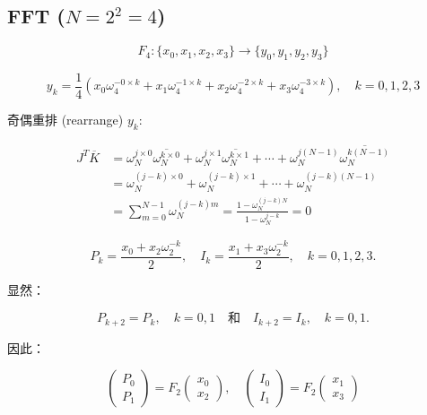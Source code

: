 \documentclass[12pt,a4paper]{article}
\numberwithin{subsection}{section}   %
\numberwithin{subsubsection}{subsection}
\theoremstyle{plain}
\theoremstyle{definition}
\theoremstyle{remark}
\theoremstyle{remark}
\begin{document}
\subsection{ FFT ($N=2^2=4$)}

\begin{equation}
	F_4: \{x_0, x_1, x_2, x_3\} \rightarrow \{y_0, y_1, y_2, y_3\}
\end{equation}

\begin{equation}
	y_k = \frac{1}{4} \left( x_0 \omega_4^{-0 \times k} + x_1 \omega_4^{-1 \times k} + x_2 \omega_4^{-2 \times k} + x_3 \omega_4^{-3 \times k} \right), \quad k = 0, 1, 2, 3
\end{equation}

奇偶重排 (rearrange) $y_k$:

\begin{equation}
	\begin{aligned}
		J^T \overline{K} &= \omega_N^{j \times 0} \overline{\omega_N^{k \times 0}} + \omega_N^{j \times 1} \overline{\omega_N^{k \times 1}} + \cdots + \omega_N^{j(N-1)} \overline{\omega_N^{k(N-1)}} \\[8pt]
		&= \omega_N^{(j - k) \times 0} + \omega_N^{(j - k) \times 1} + \cdots + \omega_N^{(j - k)(N-1)} \\[8pt]
		&= \sum_{m=0}^{N-1} \omega_N^{(j - k)m} = \frac{1 - \omega_N^{(j - k)N}}{1 - \omega_N^{j - k}} = 0
	\end{aligned}
\end{equation}


\begin{equation}
	P_k = \frac{x_0 + x_2 \omega_2^{-k}}{2}, \quad I_k = \frac{x_1 + x_3 \omega_2^{-k}}{2}, \quad k = 0, 1, 2, 3.
\end{equation}

显然：

\begin{equation}
	P_{k+2} = P_k, \quad k = 0, 1 \quad \text{和} \quad I_{k+2} = I_k, \quad k = 0, 1.
\end{equation}

因此：

\begin{equation}
	\begin{pmatrix} P_0 \\ P_1 \end{pmatrix} = F_2 \begin{pmatrix} x_0 \\ x_2 \end{pmatrix}, \quad \begin{pmatrix} I_0 \\ I_1 \end{pmatrix} = F_2 \begin{pmatrix} x_1 \\ x_3 \end{pmatrix}
\end{equation}
\end{document}

